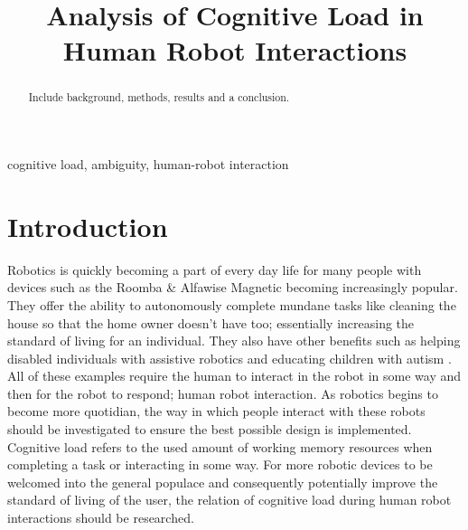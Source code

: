 \documentclass[conference]{IEEEtran}
\begin{document}
\title{Analysis of Cognitive Load in Human Robot Interactions}

\author{
}

\maketitle


\begin{abstract}
Include background, methods, results and a conclusion.
\end{abstract}

\begin{IEEEkeywords}
cognitive load, ambiguity, human-robot interaction
\end{IEEEkeywords}


\section{Introduction}
Robotics is quickly becoming a part of every day life for many people with devices such as the Roomba \cite{web:roomba} \& Alfawise Magnetic \cite{web:alfawise} becoming increasingly popular. They offer the ability to autonomously complete mundane tasks like cleaning the house so that the home owner doesn’t have too; essentially increasing the standard of living for an individual. They also have other benefits such as helping disabled individuals with assistive robotics\cite{mataric2007socially} and educating children with autism \cite{shamsuddin2012initial}. All of these examples require the human to interact in the robot in some way and then for the robot to respond; human robot interaction. \newline
As robotics begins to become more quotidian, the way in which people interact with these robots should be investigated to ensure the best possible design is implemented. Cognitive load refers to the used amount of working memory resources when completing a task or interacting in some way. For more robotic devices to be welcomed into the general populace and consequently potentially improve the standard of living of the user, the relation of cognitive load during human robot interactions should be researched. \newline
\end{document}
